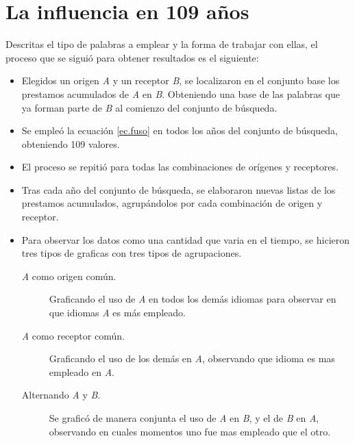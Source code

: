 \newpage

\section{La influencia en 109 años}

Descritas el tipo de palabras a emplear y la forma de trabajar con ellas, el proceso que se siguió para obtener resultados es el siguiente: 

\begin{itemize}
	
	\item Elegidos un  origen \textit{A} y un receptor \textit{B}, se localizaron en el conjunto base los prestamos acumulados de \textit{A} en \textit{B}. Obteniendo una base de las palabras que ya forman parte de \textit{B} al comienzo del conjunto de búsqueda. 
	
	\item Se empleó la ecuación \ref{ec.fuso} en todos los años del conjunto de búsqueda, obteniendo 109 valores.
	
	\item El proceso se repitió para todas las combinaciones de orígenes y receptores.
	
	\item  Tras cada año del conjunto de búsqueda, se elaboraron nuevas listas de los prestamos acumulados, agrupándolos por cada combinación de origen y receptor. 
	
	\item Para observar los datos como una cantidad que varia en el tiempo, se  hicieron tres tipos de graficas con tres tipos de agrupaciones.
	
	\begin{description}
		
		\item[\textit{A} como origen común.] Graficando el uso de \textit{A} en todos los demás idiomas para observar en que idiomas \textit{A} es más empleado. 
		
		\item[\textit{A} como receptor común.] Graficando el uso de los demás en \textit{A}, observando que idioma es mas empleado en \textit{A}.
		
		\item[Alternando \textit{A} y \textit{B}.]  Se graficó de manera conjunta el uso de \textit{A} en \textit{B}, y el de \textit{B} en \textit{A}, observando en cuales momentos uno fue mas empleado que el otro.
		
		 
		
	\end{description}	

\end{itemize}

